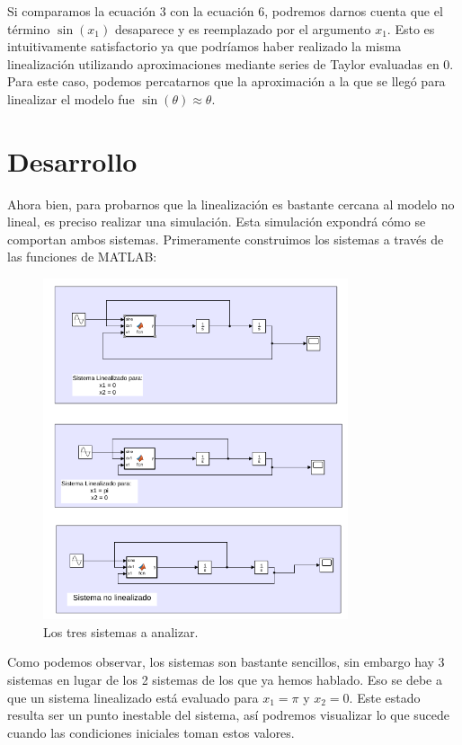 \documentclass[12pt, letterpaper]{article}
\begin{document}
Si comparamos la ecuación 3 con la ecuación 6, podremos darnos cuenta que el término $\sin(x_1)$ desaparece y es reemplazado por el argumento $x_1$. Esto es intuitivamente satisfactorio ya que podríamos haber realizado la misma linealización utilizando aproximaciones mediante series de Taylor evaluadas en 0. Para este caso, podemos percatarnos que la aproximación a la que se llegó para linealizar el modelo fue $\sin(\theta) \approx \theta$.

\section*{Desarrollo}
Ahora bien, para probarnos que la linealización es bastante cercana al modelo no lineal, es preciso realizar una simulación. Esta simulación expondrá cómo se comportan ambos sistemas. Primeramente construimos los sistemas a través de las funciones de MATLAB:

\begin{figure}[H]
	\centering
	\includegraphics[width=0.8\textwidth]{systems.png}
	\caption{Los tres sistemas a analizar.}
\end{figure}

Como podemos observar, los sistemas son bastante sencillos, sin embargo hay 3 sistemas en lugar de los 2 sistemas de los que ya hemos hablado. Eso se debe a que un sistema linealizado está evaluado para $x_1 = \pi$ y $x_2 = 0$. Este estado resulta ser un punto inestable del sistema, así podremos visualizar lo que sucede cuando las condiciones iniciales toman estos valores.
\end{document}
